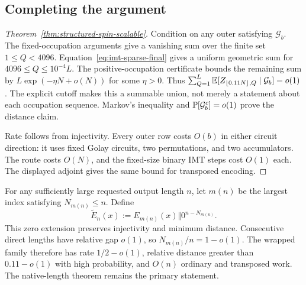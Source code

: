 \subsection{Completing the argument}

\begin{proof}[Theorem~\ref{thm:structured-spin-scalable}]
Condition on any outer satisfying $\mathcal G_b$. The fixed-occupation
arguments give a vanishing sum over the finite set $1\le Q<4096$.
Equation~\eqref{eq:imt-sparse-final} gives a uniform geometric sum for
$4096\le Q\le10^{-4}L$. The positive-occupation certificate bounds the
remaining sum by $L\exp(-\eta N+o(N))$ for some $\eta>0$.
Thus $\sum_{Q=1}^L\mathbb E[Z_{\lfloor0.11N\rfloor,Q}\mid\mathcal G_b]=o(1)$.
The explicit cutoff makes this a summable union, not merely a statement
about each occupation sequence. Markov's inequality and
$\mathbb P[\mathcal G_b^c]=o(1)$ prove the distance claim.

Rate follows from injectivity. Every outer row costs $O(b)$ in either circuit
direction: it uses fixed Golay circuits, two permutations, and two accumulators.
The route costs $O(N)$, and the fixed-size binary IMT steps cost $O(1)$ each.
The displayed adjoint gives the same bound for transposed encoding.
\end{proof}

For any sufficiently large requested output length $n$, let $m(n)$ be the
largest index satisfying $N_{m(n)}\le n$. Define
\begin{equation}
  \widetilde E_n(x)
  :=
  E_{m(n)}(x)\Vert 0^{n-N_{m(n)}}.
  \label{eq:structured-requested-length-wrapper}
\end{equation}
This zero extension preserves injectivity and minimum distance. Consecutive
direct lengths have relative gap $o(1)$, so
$N_{m(n)}/n=1-o(1)$. The wrapped family therefore has rate
$1/2-o(1)$, relative distance greater than $0.11-o(1)$ with high probability,
and $O(n)$ ordinary and transposed work. The native-length theorem remains
the primary statement.
